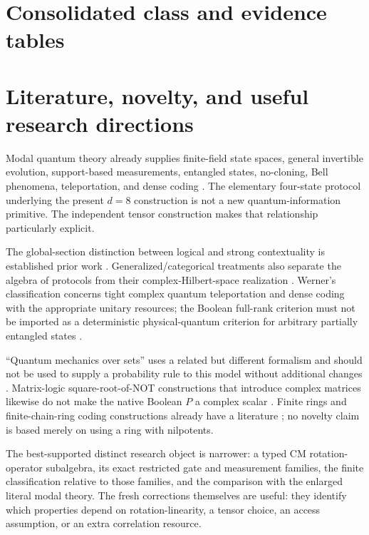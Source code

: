 \documentclass[11pt,a4paper]{article}
\theoremstyle{definition}\newtheorem{definition}[theorem]{Definition}
\begin{document}
\section{Consolidated class and evidence tables}


\section{Literature, novelty, and useful research directions}
Modal quantum theory already supplies finite-field state spaces, general invertible evolution, support-based measurements, entangled states, no-cloning, Bell phenomena, teleportation, and dense coding \cite{schumacher2011,james2011}. The elementary four-state protocol underlying the present $d=8$ construction is not a new quantum-information primitive. The independent tensor construction makes that relationship particularly explicit.

The global-section distinction between logical and strong contextuality is established prior work \cite{abramsky2011}. Generalized/categorical treatments also separate the algebra of protocols from their complex-Hilbert-space realization \cite{abramskycoecke2004}. Werner's classification concerns tight complex quantum teleportation and dense coding with the appropriate unitary resources; the Boolean full-rank criterion must not be imported as a deterministic physical-quantum criterion for arbitrary partially entangled states \cite{werner2001}.

``Quantum mechanics over sets'' uses a related but different formalism and should not be used to supply a probability rule to this model without additional changes \cite{ellerman2013}. Matrix-logic square-root-of-NOT constructions that introduce complex matrices likewise do not make the native Boolean $P$ a complex scalar \cite{mizraji2021}. Finite rings and finite-chain-ring coding constructions already have a literature \cite{liu2017}; no novelty claim is based merely on using a ring with nilpotents.

The best-supported distinct research object is narrower: a typed CM rotation-operator subalgebra, its exact restricted gate and measurement families, the finite classification relative to those families, and the comparison with the enlarged literal modal theory. The fresh corrections themselves are useful: they identify which properties depend on rotation-linearity, a tensor choice, an access assumption, or an extra correlation resource.
\end{document}
